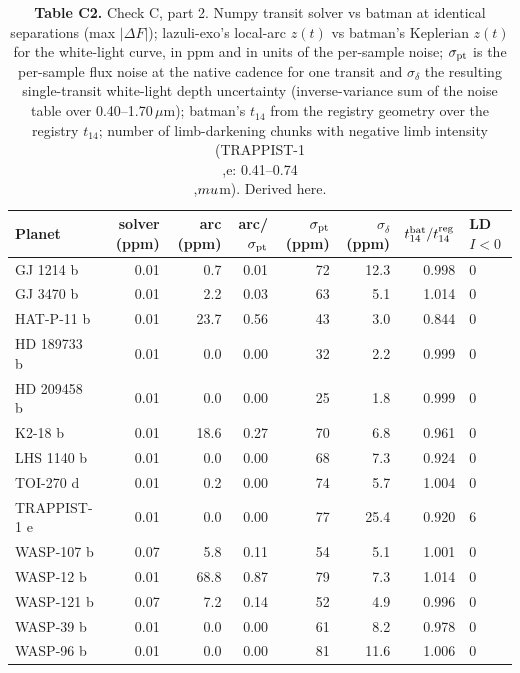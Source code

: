 \begin{table}[H]
\centering\footnotesize
\begin{tabular}{@{}lrrrrrrl@{}}
\toprule
\textbf{Planet} & \textbf{solver (ppm)} & \textbf{arc (ppm)} & \textbf{arc/$\sigma_{\rm pt}$} & \textbf{$\sigma_{\rm pt}$ (ppm)} & \textbf{$\sigma_\delta$ (ppm)} & \textbf{$t_{14}^{\rm bat}/t_{14}^{\rm reg}$} & \textbf{LD $I<0$} \\
\midrule
GJ 1214 b & 0.01 & 0.7 & 0.01 & 72 & 12.3 & 0.998 & 0 \\
GJ 3470 b & 0.01 & 2.2 & 0.03 & 63 & 5.1 & 1.014 & 0 \\
HAT-P-11 b & 0.01 & 23.7 & 0.56 & 43 & 3.0 & 0.844 & 0 \\
HD 189733 b & 0.01 & 0.0 & 0.00 & 32 & 2.2 & 0.999 & 0 \\
HD 209458 b & 0.01 & 0.0 & 0.00 & 25 & 1.8 & 0.999 & 0 \\
K2-18 b & 0.01 & 18.6 & 0.27 & 70 & 6.8 & 0.961 & 0 \\
LHS 1140 b & 0.01 & 0.0 & 0.00 & 68 & 7.3 & 0.924 & 0 \\
TOI-270 d & 0.01 & 0.2 & 0.00 & 74 & 5.7 & 1.004 & 0 \\
TRAPPIST-1 e & 0.01 & 0.0 & 0.00 & 77 & 25.4 & 0.920 & 6 \\
WASP-107 b & 0.07 & 5.8 & 0.11 & 54 & 5.1 & 1.001 & 0 \\
WASP-12 b & 0.01 & 68.8 & 0.87 & 79 & 7.3 & 1.014 & 0 \\
WASP-121 b & 0.07 & 7.2 & 0.14 & 52 & 4.9 & 0.996 & 0 \\
WASP-39 b & 0.01 & 0.0 & 0.00 & 61 & 8.2 & 0.978 & 0 \\
WASP-96 b & 0.01 & 0.0 & 0.00 & 81 & 11.6 & 1.006 & 0 \\
\bottomrule
\end{tabular}
\caption*{\footnotesize\textbf{Table C2.} Check C, part 2. Numpy transit solver vs batman at identical separations (max $|\Delta F|$); lazuli-exo's local-arc $z(t)$ vs batman's Keplerian $z(t)$ for the white-light curve, in ppm and in units of the per-sample noise; $\sigma_{\rm pt}$ is the per-sample flux noise at the native cadence for one transit and $\sigma_\delta$ the resulting single-transit white-light depth uncertainty (inverse-variance sum of the noise table over 0.40--1.70\,$\mu$m); batman's $t_{14}$ from the registry geometry over the registry $t_{14}$; number of limb-darkening chunks with negative limb intensity (TRAPPIST-1\\,e: 0.41--0.74\\,$\\mu$m). Derived here.}
\end{table}
